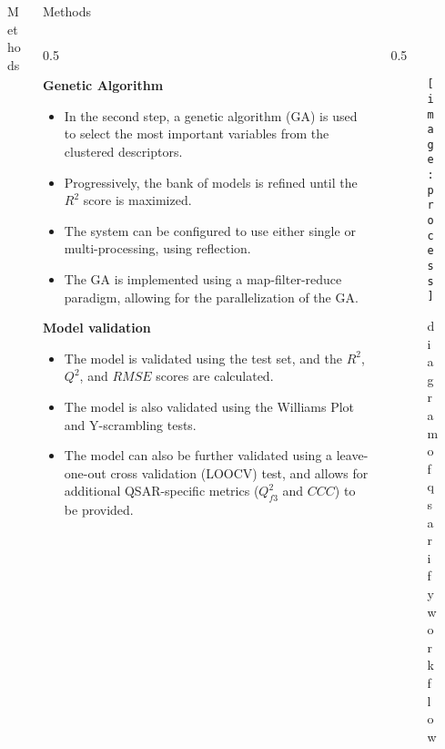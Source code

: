 \documentclass[final]{beamer}
\newlength{\colwidth}
\begin{document}
\begin{frame}[t]
\begin{columns}[t]
\begin{column}{\colwidth}
\begin{block}{Methods}
				\end{block}
			\end{column}

			\begin{column}{\colwidth}
				\begin{block}{Methods}
					\begin{columns}[t]
						\begin{column}{0.5\colwidth}


					\large{\bfseries{Genetic Algorithm}} \smallskip
					\begin{itemize}
						\item In the second step, a genetic algorithm (GA) is used to select the most important variables from the clustered descriptors.
						\item Progressively, the bank of models is refined until the $R^2$ score is maximized.
						\item The system can be configured to use either single or multi-processing, using reflection.
						\item The GA is implemented using a map-filter-reduce paradigm, allowing for the parallelization of the GA.
					\end{itemize}
\large{\bfseries{Model validation}} \smallskip
					\begin{itemize}
						\item The model is validated using the test set, and the $R^2$, $Q^2$, and $RMSE$ scores are calculated.
						\item The model is also validated using the Williams Plot and Y-scrambling tests.
						\item The model can also be further validated using a leave-one-out cross validation (LOOCV) test, and allows for additional QSAR-specific metrics ($Q^2_{f3}$ and $CCC$) to be provided.
					\end{itemize}

					\end{column}
					\begin{column}{0.5\colwidth}
						\begin{figure}
							\centering
							\texttt{[image: process]}
							\caption{diagram of qsarify workflow}
						\end{figure}


\end{column}
\end{columns}
\end{block}
\end{column}
\end{columns}
\end{frame}
\end{document}
